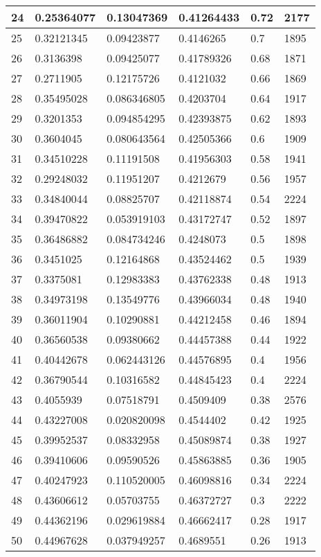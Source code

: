 \begin{longtable}{|l|l|l|l|l|l|}
24 & 0.25364077 & 0.13047369 & 0.41264433 & 0.72 & 2177 \\ \hline 
25 & 0.32121345 & 0.09423877 & 0.4146265 & 0.7 & 1895 \\ \hline 
26 & 0.3136398 & 0.09425077 & 0.41789326 & 0.68 & 1871 \\ \hline 
27 & 0.2711905 & 0.12175726 & 0.4121032 & 0.66 & 1869 \\ \hline 
28 & 0.35495028 & 0.086346805 & 0.4203704 & 0.64 & 1917 \\ \hline 
29 & 0.3201353 & 0.094854295 & 0.42393875 & 0.62 & 1893 \\ \hline 
30 & 0.3604045 & 0.080643564 & 0.42505366 & 0.6 & 1909 \\ \hline 
31 & 0.34510228 & 0.11191508 & 0.41956303 & 0.58 & 1941 \\ \hline 
32 & 0.29248032 & 0.11951207 & 0.4212679 & 0.56 & 1957 \\ \hline 
33 & 0.34840044 & 0.08825707 & 0.42118874 & 0.54 & 2224 \\ \hline 
34 & 0.39470822 & 0.053919103 & 0.43172747 & 0.52 & 1897 \\ \hline 
35 & 0.36486882 & 0.084734246 & 0.4248073 & 0.5 & 1898 \\ \hline 
36 & 0.3451025 & 0.12164868 & 0.43524462 & 0.5 & 1939 \\ \hline 
37 & 0.3375081 & 0.12983383 & 0.43762338 & 0.48 & 1913 \\ \hline 
38 & 0.34973198 & 0.13549776 & 0.43966034 & 0.48 & 1940 \\ \hline 
39 & 0.36011904 & 0.10290881 & 0.44212458 & 0.46 & 1894 \\ \hline 
40 & 0.36560538 & 0.09380662 & 0.44457388 & 0.44 & 1922 \\ \hline 
41 & 0.40442678 & 0.062443126 & 0.44576895 & 0.4 & 1956 \\ \hline 
42 & 0.36790544 & 0.10316582 & 0.44845423 & 0.4 & 2224 \\ \hline 
43 & 0.4055939 & 0.07518791 & 0.4509409 & 0.38 & 2576 \\ \hline 
44 & 0.43227008 & 0.020820098 & 0.4544402 & 0.42 & 1925 \\ \hline 
45 & 0.39952537 & 0.08332958 & 0.45089874 & 0.38 & 1927 \\ \hline 
46 & 0.39410606 & 0.09590526 & 0.45863885 & 0.36 & 1905 \\ \hline 
47 & 0.40247923 & 0.110520005 & 0.46098816 & 0.34 & 2224 \\ \hline 
48 & 0.43606612 & 0.05703755 & 0.46372727 & 0.3 & 2222 \\ \hline 
49 & 0.44362196 & 0.029619884 & 0.46662417 & 0.28 & 1917 \\ \hline 
50 & 0.44967628 & 0.037949257 & 0.4689551 & 0.26 & 1913 \\ \hline 
\end{longtable}